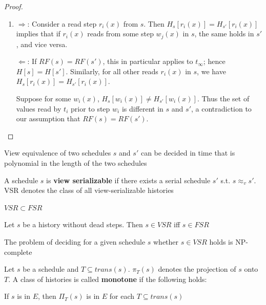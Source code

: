 \documentclass[11pt]{article}
\begin{document}
\begin{proof}
\begin{enumerate}
\item \(\Rightarrow\): Consider a read step \(r_i(x)\) from \(s\).
Then \(H_s[r_i(x)]=H_{s'}[r_i(x)]\) implies that if \(r_i(x)\) reads from some
step \(w_j(x)\) in \(s\), the same holds in \(s'\), and vice versa.

\(\Leftarrow\): If \(RF(s)=RF(s')\), this in particular applies to \(t_\infty\);
hence \(H[s]=H[s']\). Similarly, for all other reads \(r_i(x)\) in \(s\), we
have \(H_s[r_i(x)]=H_{s'}[r_i(x)]\).

Suppose for some \(w_i(x)\), \(H_s[w_i(x)]\neq H_{s'}[w_i(x)]\). Thus the set of values read
by \(t_i\) prior to step \(w_i\) is different in \(s\) and \(s'\), a contradiction to our
assumption that \(RF(s)=RF(s')\).
\end{enumerate}
\end{proof}

\begin{corollary}[]
View equivalence of two schedules \(s\) and \(s'\) can be decided in time that is polynomial in
the length of the two schedules
\end{corollary}

\begin{definition}[]
A schedule \(s\) is \textbf{view serializable} if there exists a serial schedule \(s'\)
s.t. \(s\approx_vs'\). VSR denotes the class of all view-serializable histories
\end{definition}

\begin{theorem}[]
\(VSR\subset FSR\)
\end{theorem}

\begin{theorem}[]
Let \(s\) be a history without dead steps. Then \(s\in VSR\) iff \(s\in FSR\)
\end{theorem}

\begin{theorem}[]
The problem of deciding for a given schedule \(s\) whether \(s\in VSR\) holds is NP-complete
\end{theorem}

\begin{definition}
Let \(s\) be a schedule and \(T\subseteq trans(s)\). \(\pi_T(s)\) denotes the projection
of \(s\) onto \(T\). A class of histories is called \textbf{monotone} if the following holds:
\begin{center}
If \(s\) is in \(E\), then \(\Pi_T(s)\) is in \(E\) for each \(T\subseteq trans(s)\)
\end{center}
\end{definition}
\end{document}
